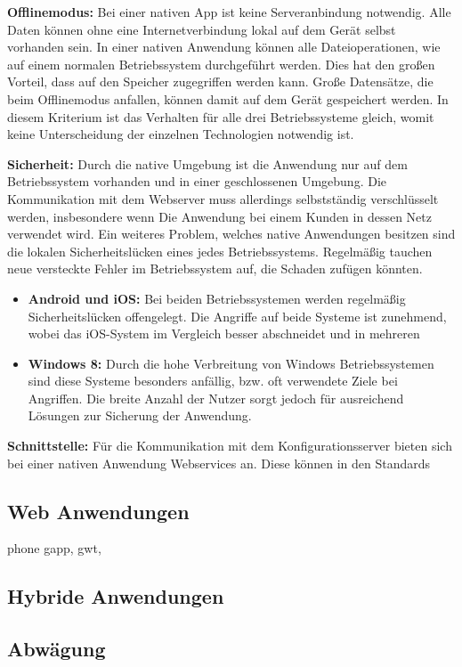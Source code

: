 \textbf{Offlinemodus:} Bei einer nativen App ist keine Serveranbindung notwendig. Alle Daten können ohne eine Internetverbindung lokal auf dem Gerät selbst vorhanden sein. In einer nativen Anwendung können alle Dateioperationen, wie auf einem normalen Betriebssystem durchgeführt werden. Dies hat den großen Vorteil, dass auf den Speicher zugegriffen werden kann. Große Datensätze, die beim Offlinemodus anfallen, können damit auf dem Gerät gespeichert werden.  In diesem Kriterium ist das Verhalten für alle drei Betriebssysteme gleich, womit keine Unterscheidung der einzelnen Technologien notwendig ist.\par

\textbf{Sicherheit:} Durch die native Umgebung ist die Anwendung nur auf dem Betriebssystem vorhanden und in einer geschlossenen Umgebung. Die Kommunikation mit dem Webserver muss allerdings selbstständig verschlüsselt werden, insbesondere wenn Die Anwendung bei einem Kunden in dessen Netz verwendet wird. Ein weiteres Problem, welches native Anwendungen besitzen sind die lokalen Sicherheitslücken eines jedes Betriebssystems. Regelmäßig tauchen neue versteckte Fehler im Betriebssystem auf, die Schaden zufügen könnten. 

\begin{itemize}
        \item \textbf{Android und iOS:} Bei beiden Betriebssystemen werden regelmäßig Sicherheitslücken offengelegt. Die Angriffe auf beide Systeme ist zunehmend, wobei das iOS-System im Vergleich besser abschneidet und in mehreren 
        
        \item \textbf{Windows 8:} Durch die hohe Verbreitung von Windows Betriebssystemen sind diese Systeme besonders anfällig, bzw. oft verwendete Ziele bei Angriffen. Die breite Anzahl der Nutzer sorgt jedoch für ausreichend Lösungen zur Sicherung der Anwendung.
        
       
\end{itemize}

\textbf{Schnittstelle:} Für die Kommunikation mit dem Konfigurationsserver bieten sich bei einer nativen Anwendung Webservices an. Diese können in den Standards 
\subsection{Web Anwendungen}
phone gapp, gwt, 
\subsection{Hybride Anwendungen}
\subsection{Abwägung}
